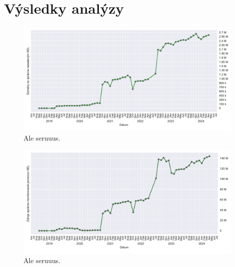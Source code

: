 
\section{Výsledky analýzy}
\label{sec:results}





\begin{figure}[!htb]
\begin{center}
 \includegraphics[scale=0.59]{obrazky-figures/httparchive_nel_deployment.pdf}
 \caption{\centering Ale seruuus.}
 \label{fig:httparchive-nel-deployment}
\end{center}
\end{figure}

\pagebreak

\begin{figure}[!htb]
\begin{center}
 \includegraphics[scale=0.59]{obrazky-figures/httparchive_nel_deployment_resources.pdf}
 \caption{\centering Ale seruuus.}
 \label{fig:httparchive-nel-deployment-resources}
\end{center}
\end{figure}

